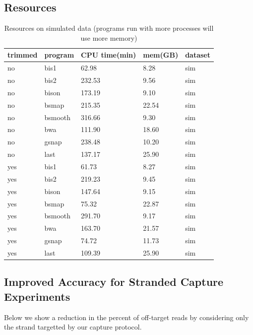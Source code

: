 \documentclass[12pt]{article}
\begin{document}
\subsection{Resources}

\begin{table}[H]
    \centering
    \caption{Resources on simulated data
(programs run with more processes will use more memory)}
    \begin{tabular}{lllll} \hline
    trimmed & program & CPU time(min) & mem(GB) & dataset \\ \hline

no &    bis1 & 62.98 & 8.28 & sim \\
no &    bis2 & 232.53 & 9.56 & sim \\
no &    bison & 173.19 & 9.10 & sim \\
no &    bsmap & 215.35 & 22.54 & sim \\
no &    bsmooth & 316.66 & 9.30 & sim \\
no &    bwa & 111.90 & 18.60 & sim \\
no &    gsnap & 238.48 & 10.20 & sim \\
no &    last & 137.17 & 25.90 & sim \\

yes &    bis1 & 61.73 & 8.27 & sim \\
yes &    bis2 & 219.23 & 9.45 & sim \\
yes &    bison & 147.64 & 9.15 & sim \\
yes &    bsmap & 75.32 & 22.87 & sim \\
yes &    bsmooth & 291.70 & 9.17 & sim \\
yes &    bwa & 163.70 & 21.57 & sim \\
yes &    gsnap & 74.72 & 11.73 & sim \\
yes &    last & 109.39 & 25.90 & sim \\

    \end{tabular}
\end{table}

\subsection{Improved Accuracy for Stranded Capture Experiments}

Below we show a reduction in the percent of off-target reads by
considering only the strand targetted by our capture protocol.
\end{document}
